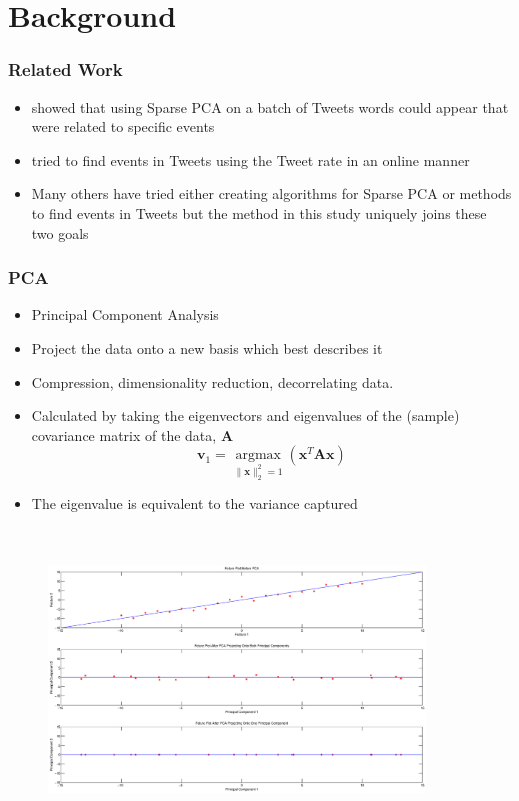 \documentclass{beamer}
\begin{document}
\section{Background}
\begin{frame}
\frametitle{Related Work}
\begin{itemize}
\item \cite{dimakis} showed that using Sparse PCA on a batch of Tweets words could appear that were related to specific events
\item  \cite{eventtwitter} tried to find events in Tweets using the Tweet rate in an online manner
\item Many others have tried either creating algorithms for Sparse PCA or methods to find events in Tweets but the method in this study uniquely joins these two goals
\end{itemize}
\end{frame}

\begin{frame}
\frametitle{PCA}
\begin{itemize}
\item Principal Component Analysis
\item Project the data onto a new basis which best describes it
\item Compression, dimensionality reduction, decorrelating data.
\item Calculated by taking the eigenvectors and eigenvalues of the (sample) covariance matrix of the data, $\mathbf{A}$
\begin{equation}
\mathbf{v}_1 = \underset{\|\mathbf{x}\|_2^2 = 1}{\operatorname{argmax}}\left( \mathbf{x}^T\mathbf{A}\mathbf{x}\right)
\end{equation}
\item The eigenvalue is equivalent to the variance captured


\end{itemize}
\end{frame}

\begin{frame}
\begin{figure}[H]
\includegraphics[height=8cm, width=10cm]{PCA_EXPLAINED.eps}
\label{pca}
\end{figure}
\end{frame}
\end{document}
